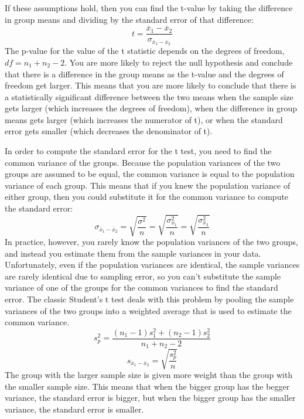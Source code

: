 \documentclass[man,a4paper,noextraspace,apacite]{apa6}
\begin{document}
If these assumptions hold, then you can find the t-value by taking the 
difference in group means and dividing by the standard error of that 
difference:   
    \begin{equation}
    t = \frac{\overline{x}_1-\overline{x}_2}{\sigma_{\overline{x}_1-\overline{x}_2}}
    \end{equation}
    The p-value for the value of the t statistic depends on the degrees of 
freedom, $df=n_1+n_2-2$. You are more likely to reject the null hypothesis and 
conclude that there is a difference in the group means as the t-value and the 
degrees of freedom get larger. This means that you are more likely to conclude 
that there is a statistically significant difference between the two means when 
the sample size gets larger (which increases the degrees of freedom), when the 
difference in group means gets larger (which increases the numerator of t), or 
when the standard error gets smaller (which decreases the denominator of t). 
    
    In order to compute the standard error for the t test, you need to find the 
common variance of the groups. Because the population variances of the 
two groups are assumed to be equal, the common variance is 
equal to the population variance of each group. This means that if you knew the 
population variance of either group, then you could substitute it for the 
common variance to compute the standard error: 
    \begin{equation}
    \sigma_{\overline{x}_1-\overline{x}_2} = \sqrt{\frac{\sigma^2}{n}} = \sqrt{\frac{\sigma_{x_1}^2}{n}} = \sqrt{\frac{\sigma_{x_2}^2}{n}}
    \end{equation}
In practice, however, you rarely know the population variances of the two groups, and 
instead you estimate them from the sample variances in your data. 
Unfortunately, even if the population variances are identical, the sample 
variances are rarely identical due to sampling error, so you can't substitute 
the sample variance of one of the groups for the common variances 
to find the standard error. The classic Student's t test deals with this 
problem by pooling the sample variances of the two groups into a weighted 
average that is used to estimate the common variance. 
    \begin{equation}
    s_p^2 = \frac{(n_1 - 1)s_1^2 + (n_2 - 1)s_2^2}{n_1 + n_2 - 2}
    \end{equation}
    \begin{equation}
    s_{\overline{x}_1-\overline{x}_2} = \sqrt{\frac{s_p^2}{n}}
    \end{equation}
The group 
with the larger sample size is given more weight than the group with the 
smaller sample size. This means that when the bigger group has the begger 
variance, the standard error is bigger, but when the bigger group has the 
smaller variance, the standard error is smaller.
\end{document}
